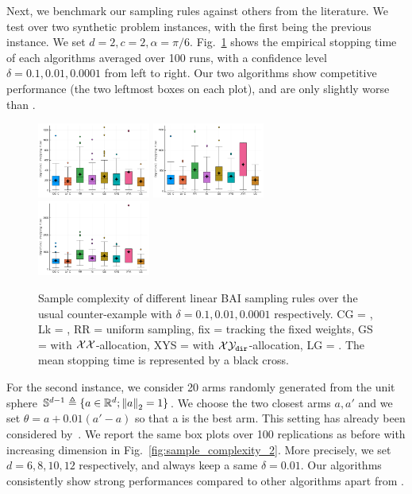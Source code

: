 Next, we benchmark our sampling rules against others from the literature. %
We test over two synthetic problem instances, with the first being the previous instance. We set $d=2, c=2, \alpha=\pi/6$. Fig.~\ref{fig:sample_complexity_1} shows the empirical stopping time of each algorithms averaged over 100 runs, with a confidence level $\delta=0.1, 0.01, 0.0001$ from left to right. Our two algorithms show competitive performance (the two leftmost boxes on each plot), and are only slightly worse than \LGapE{}.

\begin{figure}[ht]
 \centering
 \includegraphics[clip, width= 0.33\textwidth]{Chapter4/img/bai_sin_0-1}
 \includegraphics[clip, width= 0.33\textwidth]{Chapter4/img/bai_sin_0-01}
 \includegraphics[clip, width= 0.33\textwidth]{Chapter4/img/bai_sin_0-0001}
 \caption{Sample complexity of different linear BAI sampling rules over the usual counter-example with $\delta=0.1, 0.01, 0.0001$ respectively. CG = \LGC,  Lk = \LG, RR = uniform sampling, fix = tracking the fixed weights, GS = \XYS with $\mathcal{X}\mathcal{X}$-allocation, XYS = \XYS with $\mathcal{X}\mathcal{Y}_{\texttt{dir}}$-allocation, LG = \LGapE. The mean stopping time is represented by a black cross.}
 \label{fig:sample_complexity_1}
\end{figure}

For the second instance, we consider 20 arms randomly generated from the unit sphere $\mathbb{S}^{d-1}\triangleq\{a\in\mathbb{R}^d; \left\lVert a\right\rVert_2=1\}$. We choose the two closest arms $a, a'$ and we set $\theta = a + 0.01(a'-a)$ so that a is the best arm. This setting has already been considered by~\citet{tao2018alba}. We report the same box plots over 100 replications as before with increasing dimension in Fig.~\ref{fig:sample_complexity_2}. More precisely, we set $d=6, 8, 10, 12$ respectively, and always keep a same $\delta = 0.01$. Our algorithms consistently show strong performances compared to other algorithms apart from \LGapE.


